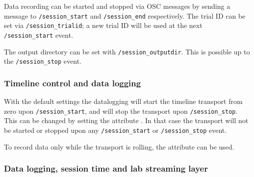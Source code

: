 Data recording can be started and stopped via OSC messages by sending a
message to \verb!/session_start! and \verb!/session_end!
respectively. The trial ID can be set via \verb!/session_trialid!; a new
trial ID will be used at the next \verb!/session_start! event.

The output directory can be set with \verb!/session_outputdir!. This is
possible up to the \verb!/session_stop! event.




\subsubsection*{Timeline control and data logging}

With the default settings the datalogging will start the timeline
transport from zero upon \verb!/session_start!, and will stop the
transport upon \verb!/session_stop!. This can be changed by setting the
attribute . In that case the transport
will not be started or stopped upon any \verb!/session_start!
or \verb!/session_stop! event.

To record data only while the transport is rolling, the
attribute  can be used.

\subsubsection*{Data logging, session time and lab streaming layer}

